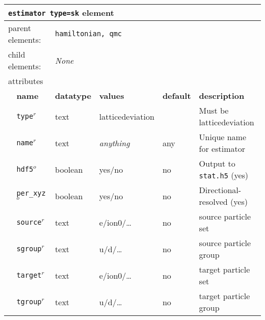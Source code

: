 \FloatBarrier
\begin{table}[h]
\begin{center}
\begin{tabularx}{\textwidth}{l l l l l l }
\hline
\multicolumn{6}{l}{\texttt{estimator type=sk} element} \\
\hline
\multicolumn{2}{l}{parent elements:} & \multicolumn{4}{l}{\texttt{hamiltonian, qmc}}\\
\multicolumn{2}{l}{child  elements:} & \multicolumn{4}{l}{\textit{None}}\\
\multicolumn{2}{l}{attributes}  & \multicolumn{4}{l}{}\\
   & \bfseries name       & \bfseries datatype & \bfseries values  & \bfseries default   & \bfseries description \\
   & \texttt{type}$^r$    &  text              & latticedeviation      &                     & Must be latticedeviation       \\
   & \texttt{name}$^r$    &  text              & \textit{anything} & any                 & Unique name for estimator \\
   & \texttt{hdf5}$^o$    &  boolean           & yes/no            & no                  & Output to \texttt{stat.h5} (yes) \\
   & \texttt{per\_xyz}$^o$    &  boolean           & yes/no            & no                  & Directional-resolved (yes) \\
   & \texttt{source}$^r$    &  text           & e/ion0/\dots         & no                  & source particle set \\
   & \texttt{sgroup}$^r$    &  text           & u/d/\dots         & no                  & source particle group \\
   & \texttt{target}$^r$    &  text           & e/ion0/\dots         & no                  & target particle set \\
   & \texttt{tgroup}$^r$    &  text           & u/d/\dots         & no                  & target particle group \\
  \hline
\end{tabularx}
\end{center}
\end{table}
\FloatBarrier

